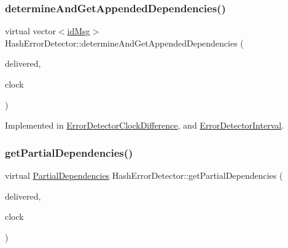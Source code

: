 \subsubsection{\texorpdfstring{determine\+And\+Get\+Appended\+Dependencies()}{determineAndGetAppendedDependencies()}}
{\footnotesize\ttfamily virtual vector$<$\hyperlink{structures_8h_a83a1d9a070efa5341da84cfd8e28d3e5}{id\+Msg}$>$ Hash\+Error\+Detector\+::determine\+And\+Get\+Appended\+Dependencies (\begin{DoxyParamCaption}\item[{const vector$<$ \hyperlink{structures_8h_a7e7bdc1d2fff8a9436f2f352b2711ed6}{message\+Info} $>$ \&}]{delivered,  }\item[{const \hyperlink{class_probabilistic_clock}{Probabilistic\+Clock} \&}]{clock }\end{DoxyParamCaption})\hspace{0.3cm}{\ttfamily [pure virtual]}}



Implemented in \hyperlink{class_error_detector_clock_difference_a15406c8d7652f3b9358b1958d3723933}{Error\+Detector\+Clock\+Difference}, and \hyperlink{class_error_detector_interval_a6cb5dc28ef7349060d15727e92a6780a}{Error\+Detector\+Interval}.

\mbox{\label{class_hash_error_detector_a5b9f7e8a6f63b1582e912102021c2d8d}} 
\subsubsection{\texorpdfstring{get\+Partial\+Dependencies()}{getPartialDependencies()}}
{\footnotesize\ttfamily virtual \hyperlink{class_partial_dependencies}{Partial\+Dependencies} Hash\+Error\+Detector\+::get\+Partial\+Dependencies (\begin{DoxyParamCaption}\item[{const vector$<$ \hyperlink{structures_8h_a7e7bdc1d2fff8a9436f2f352b2711ed6}{message\+Info} $>$ \&}]{delivered,  }\item[{const \hyperlink{class_probabilistic_clock}{Probabilistic\+Clock} \&}]{clock }\end{DoxyParamCaption})\hspace{0.3cm}{\ttfamily [pure virtual]}}



